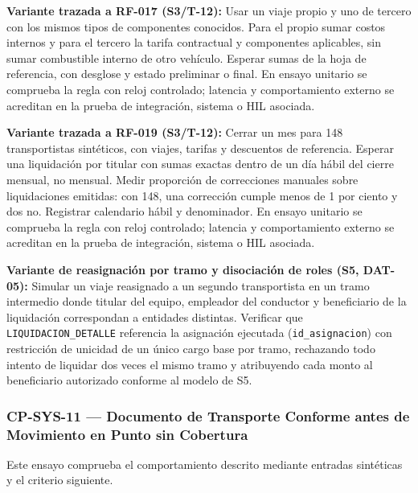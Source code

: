 \par\noindent\textbf{Variante trazada a RF-017 (S3/T-12):} Usar un viaje propio y uno de tercero con los mismos tipos de componentes conocidos. Para el propio sumar costos internos y para el tercero la tarifa contractual y componentes aplicables, sin sumar combustible interno de otro vehículo. Esperar sumas de la hoja de referencia, con desglose y estado preliminar o final. En ensayo unitario se comprueba la regla con reloj controlado; latencia y comportamiento externo se acreditan en la prueba de integración, sistema o HIL asociada.\par

\par\noindent\textbf{Variante trazada a RF-019 (S3/T-12):} Cerrar un mes para 148 transportistas sintéticos, con viajes, tarifas y descuentos de referencia. Esperar una liquidación por titular con sumas exactas dentro de un día hábil del cierre mensual, no mensual. Medir proporción de correcciones manuales sobre liquidaciones emitidas: con 148, una corrección cumple menos de 1 por ciento y dos no. Registrar calendario hábil y denominador. En ensayo unitario se comprueba la regla con reloj controlado; latencia y comportamiento externo se acreditan en la prueba de integración, sistema o HIL asociada.\par

\par\noindent\textbf{Variante de reasignación por tramo y disociación de roles (S5, DAT-05):} Simular un viaje reasignado a un segundo transportista en un tramo intermedio donde titular del equipo, empleador del conductor y beneficiario de la liquidación correspondan a entidades distintas. Verificar que \texttt{LIQUIDACION\_DETALLE} referencia la asignación ejecutada (\texttt{id\_asignacion}) con restricción de unicidad de un único cargo base por tramo, rechazando todo intento de liquidar dos veces el mismo tramo y atribuyendo cada monto al beneficiario autorizado conforme al modelo de S5.\par
\subsubsection*{CP-SYS-11 — Documento de Transporte Conforme antes de Movimiento en Punto sin Cobertura}\label{sec:9-cp-sys-11}
Este ensayo comprueba el comportamiento descrito mediante entradas sintéticas y el criterio siguiente.

